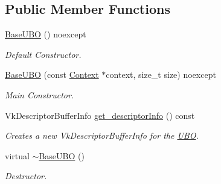 \subsection*{Public Member Functions}
\begin{DoxyCompactItemize}
\item 
\mbox{\label{classblaze_1_1BaseUBO_a09e8e765c69b703b4479b919ff5862de}} 
\hyperlink{classblaze_1_1BaseUBO_a09e8e765c69b703b4479b919ff5862de}{Base\+U\+BO} () noexcept
\begin{DoxyCompactList}\small\item\em Default Constructor. \end{DoxyCompactList}\item 
\hyperlink{classblaze_1_1BaseUBO_abc55449d131e9bb970f057ee129d3728}{Base\+U\+BO} (const \hyperlink{classblaze_1_1Context}{Context} $\ast$context, size\+\_\+t size) noexcept
\begin{DoxyCompactList}\small\item\em Main Constructor. \end{DoxyCompactList}\item 
\mbox{\label{classblaze_1_1BaseUBO_af9d9c0c2ddf95090773412488c14fa9e}} 
Vk\+Descriptor\+Buffer\+Info \hyperlink{classblaze_1_1BaseUBO_af9d9c0c2ddf95090773412488c14fa9e}{get\+\_\+descriptor\+Info} () const
\begin{DoxyCompactList}\small\item\em Creates a new Vk\+Descriptor\+Buffer\+Info for the \hyperlink{classblaze_1_1UBO}{U\+BO}. \end{DoxyCompactList}\item 
\mbox{\label{classblaze_1_1BaseUBO_a4a07203396a3ac3b29eca729149de8ca}} 
virtual \hyperlink{classblaze_1_1BaseUBO_a4a07203396a3ac3b29eca729149de8ca}{$\sim$\+Base\+U\+BO} ()
\begin{DoxyCompactList}\small\item\em Destructor. \end{DoxyCompactList}\end{DoxyCompactItemize}
